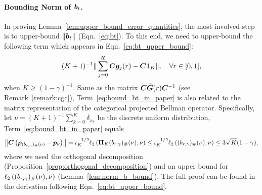 \paragraph{Bounding Norm of ${\bm{b}}_t$.}
In proving Lemma~\ref{lem:upper_bound_error_quantities}, the most involved step is to upper-bound $\left\|{{\bm{b}}_t}\right\|$ (Eqn.~\eqref{eq:bt}).
To this end, we need to upper-bound the following term which appears in Eqn.~\eqref{eq:bt_upper_bound}:
\begin{equation}\label{eq:bound_bt_in_paper}
    \begin{aligned}
    (K+1)^{-1}\|\sum_{j=0}^K{\bm{C}}{\bm{g}}_j(r)-{\bm{C}}\bm{1}_K\|,\quad\forall r\in[0,1],
    \end{aligned}
\end{equation}
when $K\geq(1-\gamma)^{-1}$.
Same as the matrix ${\bm{C}}\tilde{{\bm{G}}}(r){\bm{C}}^{-1}$ (see Remark~\ref{remark:cgc}), Term~\eqref{eq:bound_bt_in_paper} is also related to the matrix representation of the categorical projected Bellman operator. 
Specifically, let $\nu=(K+1)^{-1}\sum_{k=0}^K \delta_{x_k}$ be the discrete uniform distribution, Term~\eqref{eq:bound_bt_in_paper} equals 
\begin{equation*}
   \left\|{{\bm{C}}\left({{\bm{p}}_{(b_{r,\gamma})_\#(\nu)}-{\bm{p}}_{\nu}}\right)}\right\| = \iota_K^{-1/2}\ell_2\left({{\bm{\Pi}}_K(b_{r,\gamma})_\#(\nu),\nu}\right)\leq\iota_K^{-1/2}\ell_2\left({(b_{r,\gamma})_\#(\nu),\nu}\right)\leq 3\sqrt{K}(1-\gamma),
\end{equation*}
where we used the orthogonal decomposition (Proposition~\ref{prop:orthogonal_decomposition}) and an upper bound for $\ell_2\left({(b_{r,\gamma})_\#(\nu) ,\nu}\right)$ (Lemma~\ref{lem:norm_b_bound}).
The full proof can be found in the derivation following Eqn.~\eqref{eq:bt_upper_bound}.
